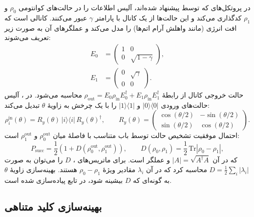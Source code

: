در پروتکل‌های  که توسط  پیشنهاد شده‌اند، آلیس اطلاعات را در حالت‌های کوانتومی $\rho_0$ و $\rho_1$ کدگذاری می‌کند و این حالت‌ها از یک کانال  با پارامتر $\gamma$ عبور می‌کنند.  کانالی است که افت انرژی (مانند واهلش آرام اتم‌ها) را مدل می‌کند و عملگرهای  آن به صورت زیر تعریف می‌شوند:
\begin{align}
	E_0 &= \begin{pmatrix} 1 & 0 \\ 0 & \sqrt{1 - \gamma} \end{pmatrix}, \\
	E_1 &= \begin{pmatrix} 0 & \sqrt{\gamma} \\ 0 & 0 \end{pmatrix}.
\end{align}
حالت خروجی کانال از رابطۀ $\rho_{\text{out}} = E_0 \rho_{\text{in}} E_0^\dagger + E_1 \rho_{\text{in}} E_1^\dagger$ محاسبه می‌شود. در ، آلیس حالت‌های ورودی $|0\rangle\langle 0|$ و $|1\rangle\langle 1|$ را با یک چرخش  به زاویۀ $\theta$ تبدیل می‌کند:
\begin{equation}
	\rho_i^{\text{in}}(\theta) = R_y(\theta)\,|i\rangle\langle i|\,R_y(\theta)^\dagger, \qquad R_y(\theta) = \begin{pmatrix} \cos(\theta/2) & -\sin(\theta/2) \\ \sin(\theta/2) & \cos(\theta/2) \end{pmatrix}.
\end{equation}
احتمال موفقیت تشخیص حالت توسط باب متناسب با فاصلۀ  میان $\rho_0^{\text{out}}$ و $\rho_1^{\text{out}}$ است:
\begin{equation}
	P_{\text{succ}} = \frac{1}{2}\left(1 + D(\rho_0^{\text{out}}, \rho_1^{\text{out}})\right), \qquad D(\rho_0, \rho_1) = \frac{1}{2}\,\text{Tr}\left|\rho_0 - \rho_1\right|,
\end{equation}
که در آن $|A| = \sqrt{A^\dagger A}$ و  عملگر  است. برای ماتریس‌های ، $D$ را می‌توان به صورت $D = \frac{1}{2}\sum_i |\lambda_i|$ محاسبه کرد که در آن $\lambda_i$ مقادیر ویژۀ $\rho_0 - \rho_1$ هستند. بهینه‌سازی زاویۀ $\theta$ به گونه‌ای که $D$ بیشینه شود، در تابع  پیاده‌سازی شده است.

\subsection{بهینه‌سازی کلید متناهی }

